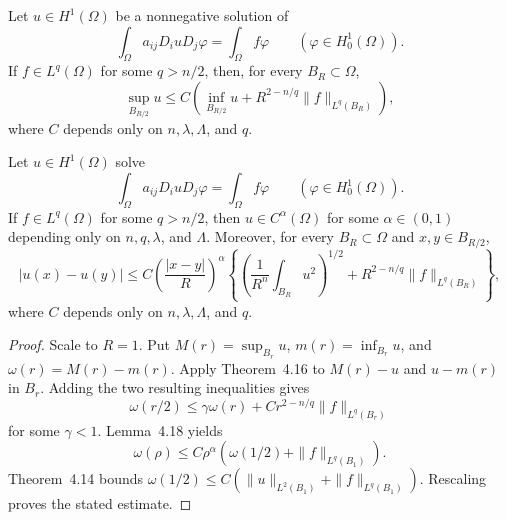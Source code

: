\begin{theorem}\label{hanlin:weaksol-part2-moser-harnack}
Let $u\in H^1(\Omega)$ be a nonnegative solution of
\[
\int_\Omega a_{ij}D_i uD_j\varphi
=\int_\Omega f\varphi
\qquad(\varphi\in H^1_0(\Omega)).
\]
If $f\in L^q(\Omega)$ for some $q>n/2$, then, for every
$B_R\subset\Omega$,
\[
\sup_{B_{R/2}}u
\leq C\left(\inf_{B_{R/2}}u
+R^{2-n/q}\|f\|_{L^q(B_R)}\right),
\]
where $C$ depends only on $n,\lambda,\Lambda$, and $q$.
\end{theorem}

\begin{corollary}\label{hanlin:weaksol-part2-moser-holder}
Let $u\in H^1(\Omega)$ solve
\[
\int_\Omega a_{ij}D_i uD_j\varphi
=\int_\Omega f\varphi
\qquad(\varphi\in H^1_0(\Omega)).
\]
If $f\in L^q(\Omega)$ for some $q>n/2$, then
$u\in C^\alpha(\Omega)$ for some $\alpha\in(0,1)$ depending only on
$n,q,\lambda$, and $\Lambda$. Moreover, for every $B_R\subset\Omega$ and
$x,y\in B_{R/2}$,
\[
|u(x)-u(y)|
\leq C\left(\frac{|x-y|}{R}\right)^\alpha
\left\{
\left(\frac1{R^n}\int_{B_R}u^2\right)^{1/2}
+R^{2-n/q}\|f\|_{L^q(B_R)}\right\},
\]
where $C$ depends only on $n,\lambda,\Lambda$, and $q$.
\end{corollary}
\begin{proof}
\sketch Scale to $R=1$. Put
$M(r)=\sup_{B_r}u$, $m(r)=\inf_{B_r}u$, and
$\omega(r)=M(r)-m(r)$. Apply Theorem~4.16 to
$M(r)-u$ and $u-m(r)$ in $B_r$. Adding the two resulting inequalities gives
\[
\omega(r/2)\leq\gamma\omega(r)
+Cr^{2-n/q}\|f\|_{L^q(B_r)}
\]
for some $\gamma<1$. Lemma~4.18 yields
\[
\omega(\rho)\leq C\rho^\alpha
\left(\omega(1/2)+\|f\|_{L^q(B_1)}\right).
\]
Theorem~4.14 bounds
$\omega(1/2)\leq C(\|u\|_{L^2(B_1)}+\|f\|_{L^q(B_1)})$.
Rescaling proves the stated estimate.
\end{proof}

